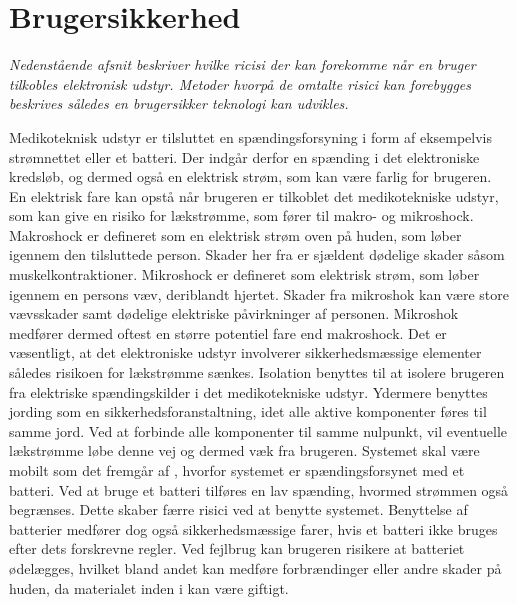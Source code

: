 \section{Brugersikkerhed}
\textit{Nedenstående afsnit beskriver hvilke ricisi der kan forekomme når en bruger tilkobles elektronisk udstyr. Metoder hvorpå de omtalte risici kan forebygges beskrives således en brugersikker teknologi kan udvikles.}

Medikoteknisk udstyr er tilsluttet en spændingsforsyning i form af eksempelvis strømnettet eller et batteri. Der indgår derfor en spænding i det elektroniske kredsløb, og dermed også en elektrisk strøm, som kan være farlig for brugeren. En elektrisk fare kan opstå når brugeren er tilkoblet det medikotekniske udstyr, som kan give en risiko for lækstrømme, som fører til makro- og mikroshock. Makroshock er defineret som en elektrisk strøm oven på huden, som løber igennem den tilsluttede person. Skader her fra er sjældent dødelige skader såsom muskelkontraktioner. Mikroshock er defineret som elektrisk strøm, som løber igennem en persons væv, deriblandt hjertet. Skader fra mikroshok kan være store vævsskader samt dødelige elektriske påvirkninger af personen. Mikroshok medfører dermed oftest en større potentiel fare end makroshock. \citep{Webster2011} \newline
Det er væsentligt, at det elektroniske udstyr involverer sikkerhedsmæssige elementer således risikoen for lækstrømme sænkes. Isolation benyttes til at isolere brugeren fra elektriske spændingskilder i det medikotekniske udstyr. Ydermere benyttes jording som en sikkerhedsforanstaltning, idet alle aktive komponenter føres til samme jord. Ved at forbinde alle komponenter til samme nulpunkt, vil eventuelle lækstrømme løbe denne vej og dermed væk fra brugeren. \citep{Webster2011} \newline 
Systemet skal være mobilt som det fremgår af , hvorfor systemet er spændingsforsynet med et batteri. Ved at bruge et batteri tilføres en lav spænding, hvormed strømmen også begrænses. Dette skaber færre risici ved at benytte systemet. Benyttelse af batterier medfører dog også sikkerhedsmæssige farer, hvis et batteri ikke bruges efter dets forskrevne regler. Ved fejlbrug kan brugeren risikere at batteriet ødelægges, hvilket bland andet kan medføre forbrændinger eller andre skader på huden, da materialet inden i kan være giftigt. 
%


